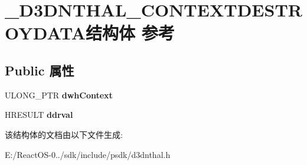 \hypertarget{struct___d3_d_n_t_h_a_l___c_o_n_t_e_x_t_d_e_s_t_r_o_y_d_a_t_a}{}\section{\+\_\+\+D3\+D\+N\+T\+H\+A\+L\+\_\+\+C\+O\+N\+T\+E\+X\+T\+D\+E\+S\+T\+R\+O\+Y\+D\+A\+T\+A结构体 参考}
\label{struct___d3_d_n_t_h_a_l___c_o_n_t_e_x_t_d_e_s_t_r_o_y_d_a_t_a}
\subsection*{Public 属性}
\begin{DoxyCompactItemize}
\item 
\mbox{\label{struct___d3_d_n_t_h_a_l___c_o_n_t_e_x_t_d_e_s_t_r_o_y_d_a_t_a_a0b1b07434b5626674358d1c2c99b1cc4}} 
U\+L\+O\+N\+G\+\_\+\+P\+TR {\bfseries dwh\+Context}
\item 
\mbox{\label{struct___d3_d_n_t_h_a_l___c_o_n_t_e_x_t_d_e_s_t_r_o_y_d_a_t_a_aea4c61ca4383d96eb63b05de212c7211}} 
H\+R\+E\+S\+U\+LT {\bfseries ddrval}
\end{DoxyCompactItemize}


该结构体的文档由以下文件生成\+:\begin{DoxyCompactItemize}
\item 
E\+:/\+React\+O\+S-\/0../sdk/include/psdk/d3dnthal.\+h\end{DoxyCompactItemize}
